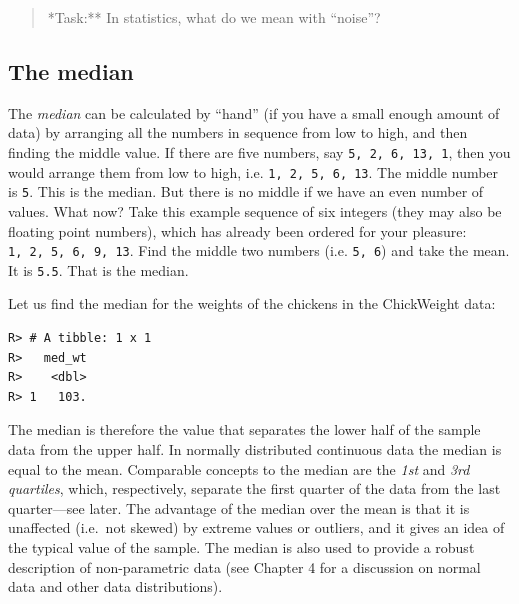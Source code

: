 \documentclass[english,10pt,a4paper,oneside]{book}
\newenvironment{Shaded}{\begin{snugshade}}{\end{snugshade}}
\newcommand{\KeywordTok}[1]{\textcolor[rgb]{0.13,0.29,0.53}{\textbf{#1}}}
\newcommand{\DataTypeTok}[1]{\textcolor[rgb]{0.13,0.29,0.53}{#1}}
\newcommand{\StringTok}[1]{\textcolor[rgb]{0.31,0.60,0.02}{#1}}
\newcommand{\OperatorTok}[1]{\textcolor[rgb]{0.81,0.36,0.00}{\textbf{#1}}}
\newcommand{\NormalTok}[1]{#1}
\theoremstyle{definition}
\theoremstyle{definition}
\theoremstyle{definition}
\theoremstyle{remark}
\begin{document}
\begin{quote}
*Task:** In statistics, what do we mean with \enquote{noise}?
\end{quote}

\subsection{The median}\label{the-median}

The \emph{median} can be calculated by \enquote{hand} (if you have a
small enough amount of data) by arranging all the numbers in sequence
from low to high, and then finding the middle value. If there are five
numbers, say \texttt{5,\ 2,\ 6,\ 13,\ 1}, then you would arrange them
from low to high, i.e. \texttt{1,\ 2,\ 5,\ 6,\ 13}. The middle number is
\texttt{5}. This is the median. But there is no middle if we have an
even number of values. What now? Take this example sequence of six
integers (they may also be floating point numbers), which has already
been ordered for your pleasure: \texttt{1,\ 2,\ 5,\ 6,\ 9,\ 13}. Find
the middle two numbers (i.e. \texttt{5,\ 6}) and take the mean. It is
\texttt{5.5}. That is the median.

Let us find the median for the weights of the chickens in the
ChickWeight data:

\begin{Shaded}
\end{Shaded}

\begin{verbatim}
R> # A tibble: 1 x 1
R>   med_wt
R>    <dbl>
R> 1   103.
\end{verbatim}

The median is therefore the value that separates the lower half of the
sample data from the upper half. In normally distributed continuous data
the median is equal to the mean. Comparable concepts to the median are
the \emph{1st} and \emph{3rd quartiles}, which, respectively, separate
the first quarter of the data from the last quarter---see later. The
advantage of the median over the mean is that it is unaffected (i.e.~not
skewed) by extreme values or outliers, and it gives an idea of the
typical value of the sample. The median is also used to provide a robust
description of non-parametric data (see Chapter 4 for a discussion on
normal data and other data distributions).
\end{document}
